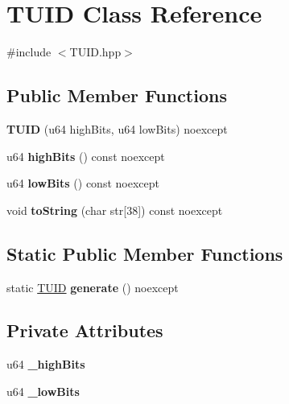 \hypertarget{class_t_u_i_d}{}\section{T\+U\+ID Class Reference}
\label{class_t_u_i_d}


{\ttfamily \#include $<$T\+U\+I\+D.\+hpp$>$}

\subsection*{Public Member Functions}
\begin{DoxyCompactItemize}
\item 
\mbox{\label{class_t_u_i_d_a9b95de9b3f8a66238154066825245d48}} 
{\bfseries T\+U\+ID} (u64 high\+Bits, u64 low\+Bits) noexcept
\item 
\mbox{\label{class_t_u_i_d_a56805ea07350451e3b4895dbed7350b0}} 
u64 {\bfseries high\+Bits} () const noexcept
\item 
\mbox{\label{class_t_u_i_d_ae90c5736b12ead378662d3771247e2e6}} 
u64 {\bfseries low\+Bits} () const noexcept
\item 
\mbox{\label{class_t_u_i_d_a41a41b4dba721ac1b61277c12b3c86ac}} 
void {\bfseries to\+String} (char str\mbox{[}38\mbox{]}) const noexcept
\end{DoxyCompactItemize}
\subsection*{Static Public Member Functions}
\begin{DoxyCompactItemize}
\item 
\mbox{\label{class_t_u_i_d_ae4de4649155bc36054f9c1f0fe40eabb}} 
static \mbox{\hyperlink{class_t_u_i_d}{T\+U\+ID}} {\bfseries generate} () noexcept
\end{DoxyCompactItemize}
\subsection*{Private Attributes}
\begin{DoxyCompactItemize}
\item 
\mbox{\label{class_t_u_i_d_a2fb2939d72f8dbf73fb421529b13dd80}} 
u64 {\bfseries \+\_\+high\+Bits}
\item 
\mbox{\label{class_t_u_i_d_a6767938b10a94b4a69fdbb4b8b7f3875}} 
u64 {\bfseries \+\_\+low\+Bits}
\end{DoxyCompactItemize}


